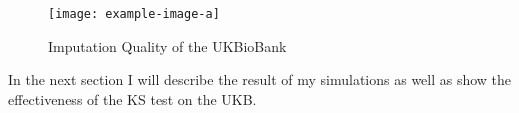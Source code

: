 \begin{figure}[htpb]
  \centering
  \texttt{[image: example-image-a]}
  \caption{Imputation Quality of the UKBioBank}\label{fig:imputation}
\end{figure}

In the next section I will describe the result of my simulations as well as show the effectiveness of the KS test on the UKB\@.
